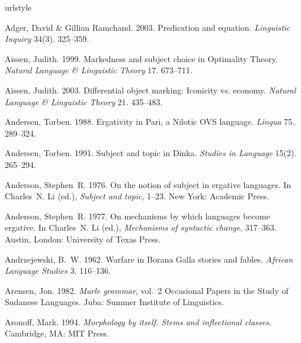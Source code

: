 \documentclass[ number=1
			   ,series=sidl
				,url=http://langsci-press.org/catalog/book/18 
			   ,isbn=978-3-944675-19-0
			   ,output=long   %
			  ]{LSP/langsci}
\begin{document}
%
\begin{thebibliography}{190}
\providecommand{\natexlab}[1]{#1}
\providecommand{\url}[1]{#1}
\providecommand{\urlprefix}{}
\expandafter\ifx\csname urlstyle\endcsname\relax
  \providecommand{\doi}[1]{doi:\discretionary{}{}{}#1}\else
  \providecommand{\doi}{doi:\discretionary{}{}{}\begingroup
  \urlstyle{rm}\Url}\fi

Adger, David \& Gillian Ramchand. 2003.
\newblock Predication and equation.
\newblock \emph{Linguistic Inquiry} 34(3). 325--359.

Aissen, Judith. 1999.
\newblock Markedness and subject choice in {O}ptimality {T}heory.
\newblock \emph{Natural Language \& Linguistic Theory} 17. 673--711.

Aissen, Judith. 2003.
\newblock Differential object marking: {I}conicity vs. economy.
\newblock \emph{Natural Language \& Linguistic Theory} 21. 435--483.

Andersen, Torben. 1988.
\newblock Ergativity in {P}ari, a {N}ilotic {OVS} language.
\newblock \emph{Lingua} 75. 289--324.

Andersen, Torben. 1991.
\newblock Subject and topic in {Dinka}.
\newblock \emph{Studies in Language} 15(2). 265--294.

Anderson, Stephen~R. 1976.
\newblock On the notion of subject in ergative languages.
\newblock In {\relax Ch}arles~N. Li (ed.), \emph{Subject and topic}, 1--23. New
  York: Academic Press.

Anderson, Stephen~R. 1977.
\newblock On mechanisms by which languages become ergative.
\newblock In {\relax Ch}arles~N. Li (ed.), \emph{Mechanisms of syntactic
  change}, 317--363. Austin, London: University of Texas Press.

Andrzejewski, B.~W. 1962.
\newblock Warfare in {B}orana {G}alla stories and fables.
\newblock \emph{African Language Studies} 3. 116--136.

Arensen, Jon. 1982.
\newblock \emph{{M}urle grammar}, vol.~2 Occasional Papers in the Study of
  Sudanese Languages.
\newblock Juba: Summer Institute of Linguistics.

Aronoff, Mark. 1994.
\newblock \emph{Morphology by itself. {S}tems and inflectional classes}.
\newblock Cambridge, MA: MIT Press.


\end{thebibliography}
\end{document}
